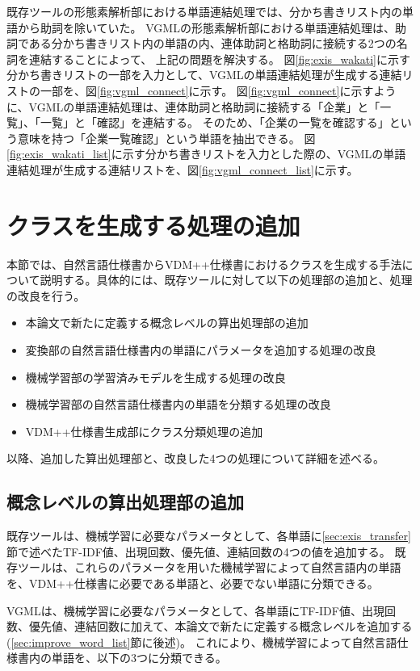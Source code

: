 既存ツールの形態素解析部における単語連結処理では、分かち書きリスト内の単語から助詞を除いていた。
VGMLの形態素解析部における単語連結処理は、助詞である分かち書きリスト内の単語の内、連体助詞と格助詞に接続する2つの名詞を連結することによって、
上記の問題を解決する。
図\ref{fig:exis_wakati}に示す分かち書きリストの一部を入力として、VGMLの単語連結処理が生成する連結リストの一部を、図\ref{fig:vgml_connect}に示す。
図\ref{fig:vgml_connect}に示すように、VGMLの単語連結処理は、連体助詞と格助詞に接続する「企業」と「一覧」、「一覧」と「確認」を連結する。
そのため、「企業の一覧を確認する」という意味を持つ「企業一覧確認」という単語を抽出できる。
図\ref{fig:exis_wakati_list}に示す分かち書きリストを入力とした際の、VGMLの単語連結処理が生成する連結リストを、図\ref{fig:vgml_connect_list}に示す。

\section{クラスを生成する処理の追加}
\label{sec:generate_class}
本節では、自然言語仕様書からVDM++仕様書におけるクラスを生成する手法について説明する。具体的には、既存ツールに対して以下の処理部の追加と、処理の改良を行う。

\begin{itemize}
    \item 本論文で新たに定義する概念レベルの算出処理部の追加
    \item 変換部の自然言語仕様書内の単語にパラメータを追加する処理の改良
    \item 機械学習部の学習済みモデルを生成する処理の改良
    \item 機械学習部の自然言語仕様書内の単語を分類する処理の改良
    \item VDM++仕様書生成部にクラス分類処理の追加
\end{itemize}

以降、追加した算出処理部と、改良した4つの処理について詳細を述べる。

\subsection{概念レベルの算出処理部の追加}
\label{sec:part_calc_concept_level}
既存ツールは、機械学習に必要なパラメータとして、各単語に\ref{sec:exis_transfer}節で述べたTF-IDF値、出現回数、優先値、連結回数の4つの値を追加する。
既存ツールは、これらのパラメータを用いた機械学習によって自然言語内の単語を、VDM++仕様書に必要である単語と、必要でない単語に分類できる。

VGMLは、機械学習に必要なパラメータとして、各単語にTF-IDF値、出現回数、優先値、連結回数に加えて、本論文で新たに定義する概念レベルを追加する(\ref{sec:improve_word_list}節に後述)。
これにより、機械学習によって自然言語仕様書内の単語を、以下の3つに分類できる。

